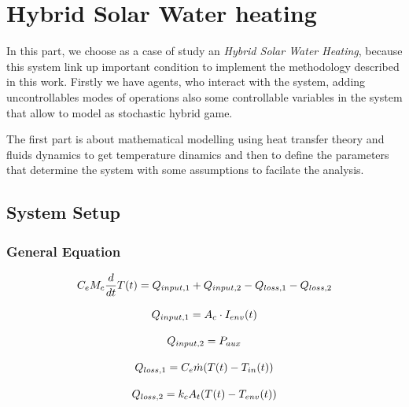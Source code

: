 \documentclass[a4paper,12pt]{book}
\begin{document}
    
    \chapter{Hybrid Solar Water heating}
    \label{ch:proposal}

    In this part, we choose as a case of study an \emph{Hybrid Solar Water
    Heating}, because this system link up important condition to implement the
    methodology described in this work. Firstly we have agents, who interact with 
    the system, adding uncontrollables modes of operations also some controllable
    variables in the system that allow to model as stochastic hybrid game.

    The first part is about mathematical modelling using heat transfer
    theory and fluids dynamics to get temperature dinamics and then 
    to define the parameters that determine the system with some
    assumptions to facilate the analysis.

    \section{System Setup}

    
    \subsection{General Equation}

    \begin{equation}
    C_eM_{c}\frac{d}{dt}T(t) =  Q_{input,1} + Q_{input,2} - Q_{loss,1} -  Q_{loss,2}
    \end{equation}

    \begin{equation}
        Q_{input,1} =   A_c\cdot I_{env}(t)
    \end{equation}

    \begin{equation}
        Q_{input,2} =   P_{aux}
    \end{equation}

    \begin{equation}
        Q_{loss,1} =  C_e \dot{m} (T(t)-T_{in}(t))
    \end{equation}

    \begin{equation}
        Q_{loss,2} =  k_c A_t (T(t)-T_{env}(t))
    \end{equation}
\end{document}
